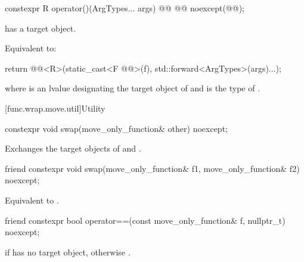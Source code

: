 \begin{itemdecl}
constexpr R operator()(ArgTypes... args) @\cv{}@ @@ noexcept(@@);
\end{itemdecl}

\begin{itemdescr}
\pnum
\expects
{} has a target object.

\pnum
\effects
Equivalent to:
\begin{codeblock}
return @@<R>(static_cast<F @@>(f), std::forward<ArgTypes>(args)...);
\end{codeblock}
where  is an lvalue designating the target object of  and  is the type of .
\end{itemdescr}

[func.wrap.move.util]{Utility}

%
\begin{itemdecl}
constexpr void swap(move_only_function& other) noexcept;
\end{itemdecl}

\begin{itemdescr}
\pnum
\effects
Exchanges the target objects of  and .
\end{itemdescr}

%
\begin{itemdecl}
friend constexpr void swap(move_only_function& f1, move_only_function& f2) noexcept;
\end{itemdecl}

\begin{itemdescr}
\pnum
\effects
Equivalent to .
\end{itemdescr}

%
\begin{itemdecl}
friend constexpr bool operator==(const move_only_function& f, nullptr_t) noexcept;
\end{itemdecl}

\begin{itemdescr}
\pnum
\returns
{} if  has no target object, otherwise .
\end{itemdescr}
